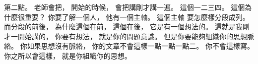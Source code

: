 \hypertarget{w01:cue:2716}{}第二點。
\hypertarget{w01:cue:2717}{}老師會把，
\hypertarget{w01:cue:2718}{}開始的時候，
\hypertarget{w01:cue:2719}{}會把講剛才講一遍。
\hypertarget{w01:cue:2720}{}這個一二三四。
\hypertarget{w01:cue:2721}{}這個為什麼很重要？
\hypertarget{w01:cue:2722}{}你要了解一個人，
\hypertarget{w01:cue:2723}{}他有一個主軸。
\hypertarget{w01:cue:2724}{}這個主軸
\hypertarget{w01:cue:2725}{}要怎麼樣分段成列。
\hypertarget{w01:cue:2726}{}而分段的前後，
\hypertarget{w01:cue:2727}{}為什麼這個在前，
\hypertarget{w01:cue:2728}{}這個在後，
\hypertarget{w01:cue:2729}{}它是有一個想法的。
\hypertarget{w01:cue:2730}{}這就是我剛才一開始講的，
\hypertarget{w01:cue:2731}{}你要有想法，
\hypertarget{w01:cue:2732}{}就是你的問題意識。
\hypertarget{w01:cue:2733}{}但是你要能夠組織你的思想脈絡。
\hypertarget{w01:cue:2734}{}你如果思想沒有脈絡，
\hypertarget{w01:cue:2735}{}你的文章不會這樣一點一點一點二。
\hypertarget{w01:cue:2736}{}你不會這樣寫。
\hypertarget{w01:cue:2737}{}你之所以會這樣，
\hypertarget{w01:cue:2738}{}就是你組織你的思想。

